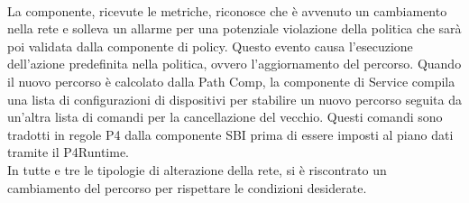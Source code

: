 \\La componente, ricevute le metriche, riconosce che è avvenuto un cambiamento nella rete e solleva un allarme per una potenziale violazione della politica che sarà poi validata dalla componente di policy.
Questo evento causa l'esecuzione dell'azione predefinita nella politica, ovvero l'aggiornamento del percorso.
Quando il nuovo percorso è calcolato dalla Path Comp, la componente di Service compila una lista di configurazioni di dispositivi per stabilire un nuovo percorso
seguita da un'altra lista di comandi per la cancellazione del vecchio. Questi comandi sono tradotti in regole P4 dalla componente SBI prima di essere imposti al piano dati 
tramite il P4Runtime.
\\In tutte e tre le tipologie di alterazione della rete, si è riscontrato un cambiamento del percorso per rispettare le condizioni desiderate. 

